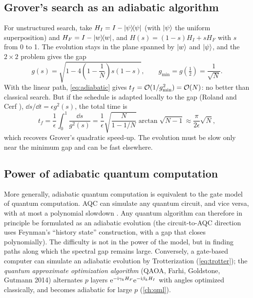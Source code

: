 \subsection{Grover's search as an adiabatic algorithm}
For unstructured search, take $H_I=I-\left|\psi\middle\rangle\!\middle\langle\psi\right|$ (with $\left|\psi\right\rangle$ the uniform superposition) and $H_F=I-\left|w\middle\rangle\!\middle\langle w\right|$, and $H(s)=(1-s)H_I+sH_F$ with $s$ from 0 to 1. The evolution stays in the plane spanned by $\left|w\right\rangle$ and $\left|\psi\right\rangle$, and the
$2\times2$ problem gives the gap
\begin{equation}
  g(s)=\sqrt{1-4\left(1-\frac1N\right)s(1-s)},\qquad g_{\min}=g(\tfrac12)=\frac1{\sqrt N}.
\end{equation}
With the linear path, \cref{eq:adiabatic} gives $t_f=\mathcal O(1/g_{\min}^2)=\mathcal O(N)$: no better than classical search. But if the schedule is adapted locally to the gap (Roland and Cerf \cite{RolandCerf2002}), $\dd s/\dd t=\epsilon g^2(s)$,
the total time is
\begin{equation}
  t_f=\frac1\epsilon\int_0^1\frac{\dd s}{g^2(s)}=\frac1\epsilon\sqrt{\frac N{1-1/N}}\arctan\sqrt{N-1}\approx\frac\pi{2\epsilon}\sqrt N,
\end{equation}
which recovers Grover's quadratic speed-up. The evolution must be slow only near the minimum gap and can be fast elsewhere.

\subsection{Power of adiabatic quantum computation}
More generally, adiabatic quantum computation is equivalent to the gate model of quantum computation. AQC can simulate any quantum circuit, and vice versa, with at most a polynomial slowdown \cite{Aharonov2007}. Any quantum algorithm can
therefore in principle be formulated as an adiabatic evolution (the circuit-to-AQC direction uses Feynman's ``history state'' construction, with a gap that closes polynomially). The difficulty is not in the power of the model, but in finding
paths along which the spectral gap remains large. Conversely, a gate-based computer can simulate an adiabatic evolution by Trotterization (\cref{eq:trotter}); the \emph{quantum approximate optimization algorithm} (QAOA, Farhi, Goldstone,
Gutmann 2014) alternates $p$ layers $\mathrm e^{-\mathrm i\gamma_kH_F}\mathrm e^{-\mathrm i\beta_kH_I}$ with angles optimized classically, and becomes adiabatic for large $p$ (\cref{ch:qml}).

